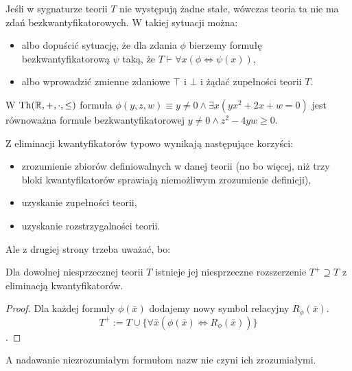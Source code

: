 \documentclass{article}
\begin{document}
\begin{uw}
	Jeśli w sygnaturze teorii $T$ nie występują żadne stałe, wówczas teoria ta nie ma zdań bezkwantyfikatorowych.
	W takiej sytuacji można:
	\begin{itemize}
		\item albo dopuścić sytuację, że dla zdania $\phi$ bierzemy formułę bezkwantyfikatorową $\psi$ taką, że $T \vdash \forall x (\phi \iff \psi(x))$,
		\item albo wprowadzić zmienne zdaniowe $\top$ i $\bot$ i żądać zupełności teorii $T$.
	\end{itemize}
\end{uw}

\begin{prz}
	W $\text{Th}(\mathbb{R}, +, \cdot, \leq)$ formuła $\phi(y, z, w) \equiv y \neq 0 \wedge \exists x (yx^2 + 2x + w = 0)$ jest równoważna formule bezkwantyfikatorowej $y \neq 0 \wedge z^2 - 4yw \geq 0$.
\end{prz}

Z eliminacji kwantyfikatorów typowo wynikają następujące korzyści:
\begin{itemize}
	\item zrozumienie zbiorów definiowalnych w danej teorii (no bo więcej, niż trzy bloki kwantyfikatorów sprawiają niemożliwym zrozumienie definicji),
	\item uzyskanie zupełności teorii,
	\item uzyskanie rozstrzygalności teorii.
\end{itemize}

Ale z drugiej strony trzeba uważać, bo:

\begin{stw} Dla dowolnej niesprzecznej teorii $T$ istnieje jej niesprzeczne rozszerzenie $T^+ \supseteq T$ z eliminacją kwantyfikatorów.
\end{stw}
\begin{proof}
	Dla każdej formuły $\phi(\bar{x})$ dodajemy nowy symbol relacyjny $R_{\phi}(\bar{x})$.
	\[T^+ := T \cup \{\forall \bar{x} (\phi(\bar{x}) \iff R_{\phi}(\bar{x}))\}\].
\end{proof}
A nadawanie niezrozumiałym formułom nazw nie czyni ich zrozumiałymi.
\end{document}

